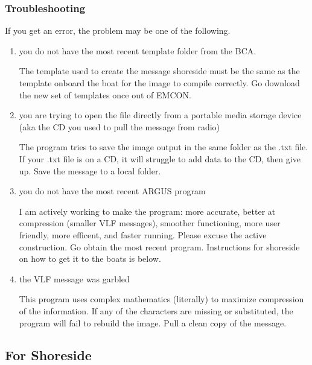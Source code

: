 \subsubsection{Troubleshooting}
If you get an error, the problem may be one of the following.
\begin{enumerate}
    \item you do not have the most recent template folder from the BCA.  
    \begin{addsoln} The template used to create the message shoreside must be the same as the template onboard the boat for the image to compile correctly. Go download the new set of templates once out of EMCON.\end{addsoln}
    \item you are trying to open the file directly from a portable media storage device (aka the CD you used to pull the message from radio) 
    \begin{addsoln} The program tries to save the image output in the same folder as the .txt file. If your .txt file is on a CD, it will struggle to add data to the CD, then give up. Save the message to a local folder.\end{addsoln}
    \item you do not have the most recent ARGUS program  
    \begin{addsoln} I am actively working to make the program: more accurate, better at compression (smaller VLF messages), smoother functioning, more user friendly, more efficent, and faster running.  Please excuse the active construction. Go obtain the most recent program.  Instructions for shoreside on how to get it to the boats is below.\end{addsoln}
    \item the VLF message was garbled
    \begin{addsoln} This program uses complex mathematics (literally) to maximize compression of the information. If any of the characters are missing or substituted, the program will fail to rebuild the image. Pull a clean copy of the message.\end{addsoln}
\end{enumerate}


\subsection{For Shoreside}

